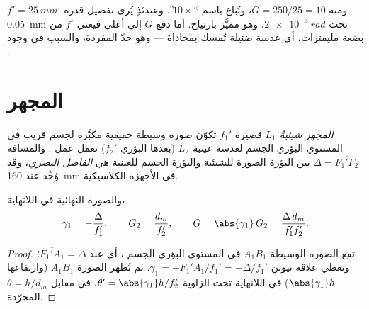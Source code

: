 \begin{example}\label{ex:b1:optical-instruments:loupe}
$f' = \qty{25}{mm}$: ومنه $G = 250/25 = 10$، وتُباع باسم ``$10\times$''. وعندئذٍ
يُرى تفصيل قدره \qty{0.05}{mm} تحت $\qty{2e-3}{rad}$، وهو مميَّز
بارتياح. أما دفع $G$ إلى أعلى فيعني $f'$ من بضعة مليمترات، أي عدسة
ضئيلة تُمسك بمحاذاة  --- وهو حدّ  المفردة، والسبب
في وجود .
\end{example}

\section{المجهر}

\begin{definition}\label{def:b1:optical-instruments:microscope}
\emph{المجهر} \emph{شيئيةٌ} $L_1$ قصيرة 
$f_1'$ تكوّن صورة وسيطة حقيقية مكبَّرة لجسم قريب
في المستوي البؤري الجسم لعدسة \emph{عينية} $L_2$ (بعدها البؤري
$f_2'$) تعمل عمل . والمسافة $\Delta =
\overline{F_1'F_2}$ بين البؤرة الصورة للشيئية والبؤرة الجسم
للعينية هي \emph{الفاصل البصري}، وقد وُحِّد عند
\qty{160}{mm} في الأجهزة الكلاسيكية.
\end{definition}

\begin{proposition}\label{prop:b1:optical-instruments:microscope}
والصورة النهائية في اللانهاية،
\[
\gamma_1 = -\frac{\Delta}{f_1'}, \qquad G_2 = \frac{d_m}{f_2'},
\qquad G = \abs{\gamma_1}\,G_2 = \frac{\Delta\,d_m}{f_1' f_2'} .
\]
\end{proposition}

\begin{proof}
تقع الصورة الوسيطة $A_1B_1$ في المستوي البؤري الجسم ،
أي عند $\overline{F_1'A_1} = \Delta$؛ وتعطي علاقة نيوتن
$\gamma_1 = -\overline{F_1'A_1}/f_1' = -\Delta/f_1'$. ثم تُظهر 
الصورة $A_1B_1$ (وارتفاعها $\abs{\gamma_1} h$) في اللانهاية تحت الزاوية
$\theta' = \abs{\gamma_1} h/f_2'$، في مقابل $\theta = h/d_m$ 
المجرّدة.
\end{proof}

